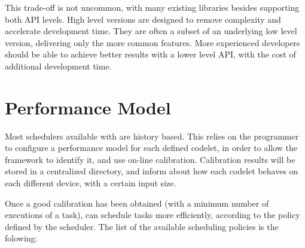 \documentclass[main.tex]{subfiles}
\begin{document}
This trade-off is not uncommon, with many existing libraries besides \starpu supporting both API levels. High level versions are designed to remove complexity and accelerate development time. They are often a subset of an underlying low level version, delivering only the more common features. More experienced developers should be able to achieve better results with a lower level API, with the cost of additional development time.

\section{Performance Model}

Most schedulers available with \starpu are history based. This relies on the programmer to configure a performance model for each defined codelet, in order to allow the framework to identify it, and use on-line calibration. Calibration results will be stored in a centralized directory, and inform \starpu about how each codelet behaves on each different device, with a certain input size.

Once a good calibration has been obtained (with a minimum number of executions of a task), \starpu can schedule tasks more efficiently, according to the policy defined by the scheduler. The list of the available scheduling policies is the folowing:
\end{document}
